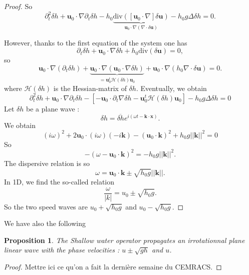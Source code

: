\documentclass[a4paper, 11pt]{report}
\newtheorem{Proposition}{Proposition}
\begin{document}
\begin{proof}
So 
\begin{equation*}
\partial_t^2\delta h+\boldsymbol{u}_0\cdot\nabla\partial_t\delta h-h_0\underbrace{\text{div}\left(\left[\boldsymbol{u}_0\cdot\nabla\right]\delta \boldsymbol{u}\right)}_{\boldsymbol{u}_0\cdot \nabla\left(\nabla\cdot \delta \boldsymbol{u}\right)}-h_0g\Delta \delta h=0.
\end{equation*}

However, thanks to the first equation of the system one has
\begin{equation*}
\partial_t\delta h+\boldsymbol{u}_0\cdot\nabla\delta h+h_0\text{div}\left(\delta \boldsymbol{u}\right)=0,
\end{equation*}
so
\begin{equation*}
\boldsymbol{u}_0\cdot\nabla\left(\partial_t \delta h\right)+\underbrace{\boldsymbol{u}_0\cdot\nabla\left(\boldsymbol{u}_0\cdot\nabla\delta h\right)}_{=\boldsymbol{u}_0^t\mathcal{H}\left(\delta h\right)\boldsymbol{u}_0}+\boldsymbol{u}_0\cdot \nabla\left(h_0\nabla\cdot \delta \boldsymbol{u}\right)=0.
\end{equation*}
where $\mathcal{H}\left( \delta h\right)$ is the Hessian-matrix of $\delta h$.
Eventually, we obtain
\begin{equation*}
\partial_t^2\delta h+\boldsymbol{u}_0\cdot \nabla\partial_t\delta h-\left[-\boldsymbol{u}_0\cdot\partial_t\nabla \delta h-\boldsymbol{u}_0^t\mathcal{H}\left( \delta h\right)\boldsymbol{u}_0\right]-h_0g\Delta \delta h=0
\end{equation*}
Let $\delta h$ be a plane wave : \begin{equation*}
\delta h=\overline{\delta h}e^{i(\omega t-\boldsymbol{k}\cdot \boldsymbol{x})}.
\end{equation*}
We obtain
\begin{equation*}
\left(i\omega\right)^2+2\boldsymbol{u}_0\cdot(i\omega)(-i\boldsymbol{k})-\left(\boldsymbol{u}_0\cdot\boldsymbol{k}\right)^2+h_0g||\boldsymbol{k}||^2=0
\end{equation*}
So
\begin{equation*}
-\left(\omega-\boldsymbol{u}_0\cdot\boldsymbol{k}\right)^2=-h_0g||\boldsymbol{k}||^2.
\end{equation*}
The dispersive relation is so
\begin{equation}
\omega=\boldsymbol{u}_0\cdot \boldsymbol{k}\pm\sqrt{h_0g}||\boldsymbol{k}||.
\end{equation}
In 1D, we find the so-called relation
\begin{equation*}
\frac{\omega}{|k|}=u_0\pm\sqrt{h_0g}.
\end{equation*}
So the two speed waves are $u_0+\sqrt{h_0g}$ and $u_0-\sqrt{h_0g}$.
\end{proof}
We have also the following
\begin{Proposition}
The Shallow water operator propagates an irrotationnal plane linear wave with the phase velocities : $u\pm \sqrt{gh}$ and $u$.
\end{Proposition}
\begin{proof}
Mettre ici ce qu'on a fait la derni\`ere semaine du CEMRACS.
\end{proof}
\end{document}
